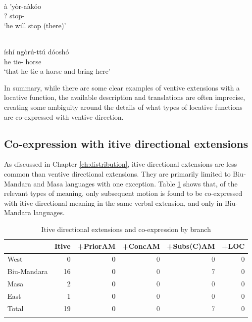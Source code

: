 \ea\label{ex:bole111}
 \\
\gll à 'yòr-aàkóo \\
? stop-		\\
\glt `he will stop (there)'	

\ex\label{ex:bole1}
 \\
\gll íshí	ngòrú-ttú	dóoshó \\
he	tie-	horse \\
\glt `that he tie a horse and bring here'
\z 

In summary, while there are some clear examples of ventive extensions with a locative function, the available description and translations are often imprecise, creating some ambiguity around the details of what types of locative functions are co-expressed with ventive direction. 

\subsection{Co-expression with itive directional extensions} \label{sec:coitive}

As discussed in Chapter \ref{ch:distribution}, itive directional extensions are less common than ventive directional extensions. They are primarily limited to Biu-Mandara and Masa languages with one exception. Table \ref{tab:itive_plusTABLE} shows that, of the relevant types of meaning, only subsequent motion is found to be co-expressed with itive directional meaning in the same verbal extension, and only in Biu-Mandara languages.

\begin{table}
	\caption{Itive directional extensions and co-expression by branch}
	\label{tab:itive_plusTABLE}
	\begin{tabular}{lrrrrr} %
		\lsptoprule
	{} &  Itive &  +PriorAM &  +ConcAM &  +Subs(C)AM &  +LOC \\
		\midrule
West &      0 &         0 &        0 &           0 &     0 \\
Biu-Mandara &     16 &         0 &        0 &           7 &     0 \\
Masa &      2 &         0 &        0 &           0 &     0 \\
East &      1 &         0 &        0 &           0 &     0 \\
\midrule
Total &     19 &         0 &        0 &           7 &     0 \\
		\lspbottomrule
	\end{tabular}
\end{table}

